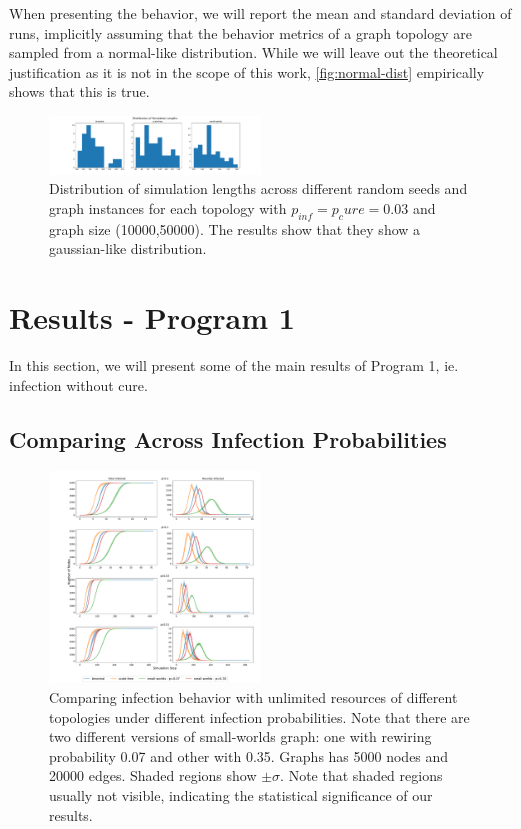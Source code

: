 \documentclass[conference]{IEEEtran}
\begin{document}
When presenting the behavior, we will report the mean and standard deviation of runs, implicitly assuming that the behavior metrics of a graph topology are sampled from a normal-like distribution. While we will leave out the theoretical justification as it is not in the scope of this work, \autoref{fig:normal-dist} empirically shows that this is true.

\begin{figure}[htb]
  \begin{center}
	\includegraphics[width=0.5\textwidth]{img/distributions.pdf}
  \end{center}
	\caption{Distribution of simulation lengths across different random seeds and graph instances for each topology with $p_{inf} = p_cure = 0.03$ and graph size (10000,50000). The results show that they show a gaussian-like distribution.}
	\label{fig:normal-dist}
\end{figure}

\section{Results - Program 1}

In this section, we will present some of the main results of Program 1, ie. infection without cure.

\subsection{Comparing Across Infection Probabilities}\label{sec:pg1-compare-pis}

\begin{figure}[htb]
  \begin{center}
	\includegraphics[width=0.5\textwidth]{img/pg1-pis-compare_ms_5k.pdf}
  \end{center}
	\caption{Comparing infection behavior with unlimited resources of different topologies under different infection probabilities. Note that there are two different versions of small-worlds graph: one with rewiring probability 0.07 and other with 0.35. Graphs has 5000 nodes and 20000 edges. Shaded regions show $\pm \sigma$. Note that shaded regions usually not visible, indicating the statistical significance of our results.}
	\label{fig:pg1-pis-compare_ms_5k}
\end{figure}
\end{document}
